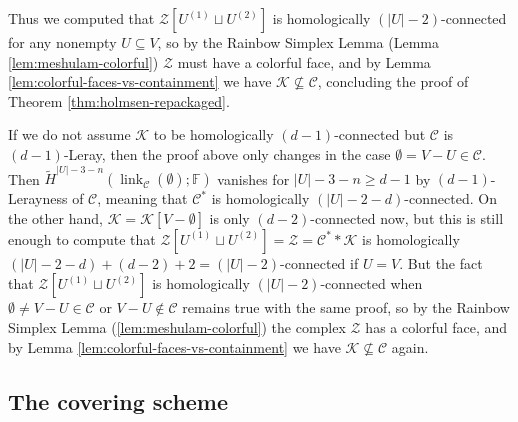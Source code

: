 \documentclass[a4paper,11pt,reqno, english]{amsart}
\theoremstyle{definition}
\theoremstyle{remark}
\DeclareMathOperator{\link}{\mathrm{link}}
\begin{document}
Thus we computed that $\mathscr{Z}[U^{(1)}\sqcup U^{(2)}]$ is homologically $(|U|-2)$-connected for any nonempty $U\subseteq V$, so by the Rainbow Simplex Lemma (Lemma \ref{lem:meshulam-colorful}) $\mathscr{Z}$ must have a colorful face, and by Lemma \ref{lem:colorful-faces-vs-containment} we have $\mathscr{K}\nsubseteq\mathscr{C}$, concluding the proof of Theorem \ref{thm:holmsen-repackaged}.

If we do not assume $\mathscr{K}$ to be homologically $(d-1)$-connected but $\mathscr{C}$ is $(d-1)$-Leray, then the proof above only changes in the case $\emptyset=V-U\in\mathscr{C}$. Then $\tilde{H}^{|U|-3-n}(\link_\mathscr{C}(\emptyset);\mathbb{F})$ vanishes for $|U|-3-n\geq d-1$ by $(d-1)$-Lerayness of $\mathscr{C}$, meaning that $\mathscr{C}^*$ is homologically $(|U|-2-d)$-connected. On the other hand, $\mathscr{K}=\mathscr{K}[V-\emptyset]$ is only $(d-2)$-connected now, but this is still enough to compute that $\mathscr{Z}[U^{(1)}\sqcup U^{(2)}]=\mathscr{Z}=\mathscr{C}^**\mathscr{K}$ is homologically $(|U|-2-d)+(d-2)+2=(|U|-2)$-connected if $U=V$. But the fact that $\mathscr{Z}[U^{(1)}\sqcup U^{(2)}]$ is homologically $(|U|-2)$-connected when $\emptyset\neq V-U\in\mathscr{C}$ or $V-U\notin\mathscr{C}$ remains true with the same proof, so by the Rainbow Simplex Lemma (\ref{lem:meshulam-colorful}) the complex $\mathscr{Z}$ has a colorful face, and by Lemma \ref{lem:colorful-faces-vs-containment} we have $\mathscr{K}\nsubseteq\mathscr{C}$ again.

\medskip
\subsection{The covering scheme}\label{sec:the-method:covering-scheme}
\medskip
\end{document}

